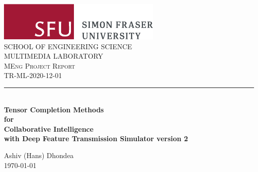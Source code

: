 
\begin{titlepage}
	\centering
	\includegraphics[scale = 0.75]{Figures/SFUhorizontallogorgb.pdf}\\[1.0 cm]
	\textsc{SCHOOL OF ENGINEERING SCIENCE}\\[0.2 cm]
	\textsc{MULTIMEDIA LABORATORY}\\[2.2 cm]
	\textsc{\Large MEng Project Report}\\[0.5 cm]
	\textsc{\normalsize TR-ML-2020-12-01 }\\[0.2 cm]
	\rule{\linewidth}{0.2 mm} \\[0.4 cm]
	
	\textbf{\Large Tensor Completion Methods \\ for \\ Collaborative Intelligence} \\[0.2 cm]
	\textbf{\large with Deep Feature Transmission Simulator version 2}
	
	
	\vspace*{2cm}
	Ashiv (Hans) Dhondea\linebreak
	\\
	\vspace{5cm}
	\today
	
	\vfill
	
\end{titlepage}